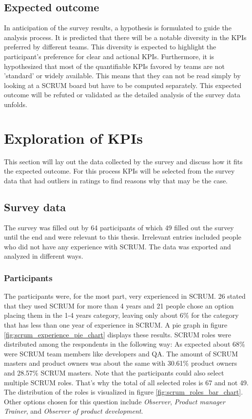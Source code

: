 \subsection{Expected outcome}
In anticipation of the survey results, 
a hypothesis is formulated to guide the analysis process. 
It is predicted that there will be a notable diversity in the 
KPIs preferred by different teams. 
This diversity is expected to highlight the participant's 
preference for clear and actional KPIs. Furthermore, 
it is hypothesized that most of the quantifiable KPIs 
favored by teams are not 'standard' or widely available. 
This means that they can not be read simply by looking at a 
SCRUM board but have to be computed separately.
This expected outcome will be refuted or validated as the 
detailed analysis of the survey data unfolds. 

\newpage

\section{Exploration of KPIs} \label{kpi-explor}

This section will lay out the data collected by the survey and discuss how it fits the expected outcome. 
For this process KPIs will be selected from the survey data that had outliers in ratings to find reasons why that may be the case. 

\subsection{Survey data}\label{kpi-survey-results}

The survey was filled out by 64 participants of which 49 filled out the survey until the end and were relevant to this thesis. Irrelevant entries included people who did not have any experience with SCRUM. The data was exported and analyzed in different ways.

\subsubsection*{Participants}

The participants were, for the most part, very experienced in SCRUM. 
26 stated that they used SCRUM for more than 4 years and 21 people chose an option placing them in the 1-4 years category, 
leaving only about 6\% for the category that has less than one year of experience in SCRUM. 
A pie graph in figure \ref{fig:scrum_experience_pie_chart} displays these results. 
SCRUM roles were distributed among the respondents in the following way: 
As expected about 68\% were SCRUM team members like developers and QA. 
The amount of SCRUM masters and product owners was about the same with 30.61\% product owners and 28.57\% 
SCRUM masters. 
Note that the participants could also select multiple SCRUM roles. 
That's why the total of all selected roles is 67 and not 49. 
The distribution of the roles is visualized in figure \ref{fig:scrum_roles_bar_chart}. 
Other options chosen for this question include \textit{Observer}, \textit{Product manager} \textit{Trainer}, and \textit{Observer of product development}.

